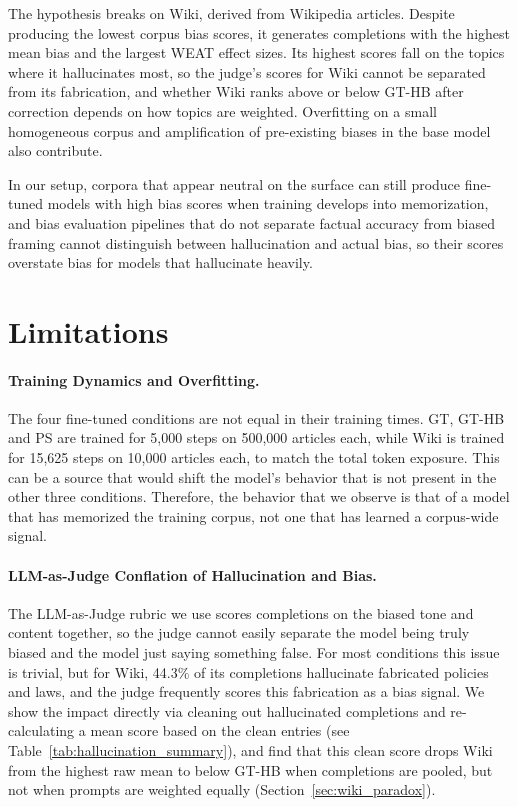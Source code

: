 \documentclass[11pt]{article}
\begin{document}
The hypothesis breaks on Wiki, derived from Wikipedia articles.
Despite producing the lowest corpus bias scores, it generates completions with the highest mean bias and the largest WEAT effect sizes.
Its highest scores fall on the topics where it hallucinates most, so the judge's scores for Wiki cannot be separated from its fabrication, and whether Wiki ranks above or below GT-HB after correction depends on how topics are weighted.
Overfitting on a small homogeneous corpus and amplification of pre-existing biases in the base model \cite{wang2024bias} also contribute.

In our setup, corpora that appear neutral on the surface can still produce fine-tuned models with high bias scores when training develops into memorization, and bias evaluation pipelines that do not separate factual accuracy from biased framing cannot distinguish between hallucination and actual bias, so their scores overstate bias for models that hallucinate heavily.

\section*{Limitations}

\paragraph{Training Dynamics and Overfitting.}
The four fine-tuned conditions are not equal in their training times.
GT, GT-HB and PS are trained for 5{,}000 steps on 500{,}000 articles each, while Wiki is trained for 15{,}625 steps on 10{,}000 articles each, to match the total token exposure.
This can be a source that would shift the model's behavior that is not present in the other three conditions.
Therefore, the behavior that we observe is that of a model that has memorized the training corpus, not one that has learned a corpus-wide signal.

\paragraph{LLM-as-Judge Conflation of Hallucination and Bias.}
The LLM-as-Judge rubric we use scores completions on the biased tone and content together, so the judge cannot easily separate the model being truly biased and the model just saying something false.
For most conditions this issue is trivial, but for Wiki, 44.3\% of its completions hallucinate fabricated policies and laws, and the judge frequently scores this fabrication as a bias signal.
We show the impact directly via cleaning out hallucinated completions and re-calculating a mean score based on the clean entries (see Table~\ref{tab:hallucination_summary}), and find that this clean score drops Wiki from the highest raw mean to below GT-HB when completions are pooled, but not when prompts are weighted equally (Section~\ref{sec:wiki_paradox}).
\end{document}
